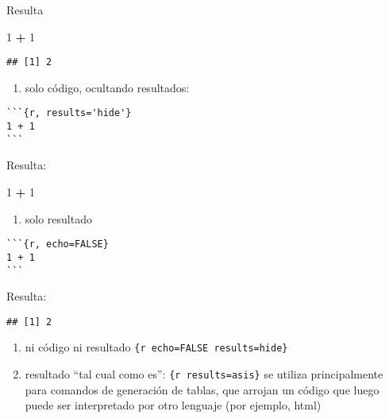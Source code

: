 \documentclass[
  11pt,
]{book}
\newenvironment{Shaded}{\begin{snugshade}}{\end{snugshade}}
\newcommand{\DecValTok}[1]{\textcolor[rgb]{0.00,0.00,0.81}{#1}}
\newcommand{\OperatorTok}[1]{\textcolor[rgb]{0.81,0.36,0.00}{\textbf{#1}}}
\newcommand{\StringTok}[1]{\textcolor[rgb]{0.31,0.60,0.02}{#1}}
\providecommand{\tightlist}{%
  \setlength{\itemsep}{0pt}\setlength{\parskip}{0pt}}
\begin{document}
Resulta

\begin{Shaded}
\begin{Highlighting}[]
\DecValTok{1} \OperatorTok{+}\StringTok{ }\DecValTok{1}
\end{Highlighting}
\end{Shaded}

\begin{verbatim}
## [1] 2
\end{verbatim}

\begin{enumerate}
\def\labelenumi{\arabic{enumi}.}
\setcounter{enumi}{1}
\tightlist
\item
  solo código, ocultando resultados:
\end{enumerate}

\begin{verbatim}
```{r, results='hide'}
1 + 1
```
\end{verbatim}

Resulta:

\begin{Shaded}
\begin{Highlighting}[]
\DecValTok{1} \OperatorTok{+}\StringTok{ }\DecValTok{1}
\end{Highlighting}
\end{Shaded}

\begin{enumerate}
\def\labelenumi{\arabic{enumi}.}
\setcounter{enumi}{2}
\tightlist
\item
  solo resultado
\end{enumerate}

\begin{verbatim}
```{r, echo=FALSE}
1 + 1
```
\end{verbatim}

Resulta:

\begin{verbatim}
## [1] 2
\end{verbatim}

\begin{enumerate}
\def\labelenumi{\arabic{enumi}.}
\setcounter{enumi}{3}
\tightlist
\item
  ni código ni resultado \texttt{\{r\ echo=FALSE\ results=\textquotesingle{}hide\textquotesingle{}\}}
\item
  resultado ``tal cual como es'': \texttt{\{r\ results=\textquotesingle{}asis\textquotesingle{}\}} se utiliza principalmente para comandos de generación de tablas, que arrojan un código que luego puede ser interpretado por otro lenguaje (por ejemplo, html)
\end{enumerate}
\end{document}
